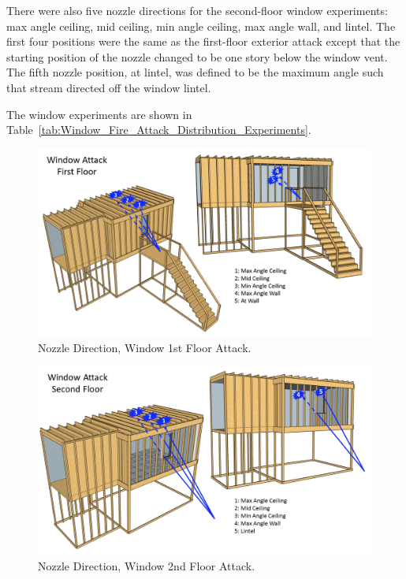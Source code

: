 \documentclass[12pt,oneside]{book}
\begin{document}
There were also five nozzle directions for the second-floor window experiments: max angle ceiling, mid ceiling, min angle ceiling, max angle wall, and lintel. The first four positions were the same as the first-floor exterior attack except that the starting position of the nozzle changed to be one story below the window vent. The fifth nozzle position, at lintel, was defined to be the maximum angle such that stream directed off the window lintel.

The window experiments are shown in Table~\ref{tab:Window_Fire_Attack_Distribution_Experiments}.

\begin{figure}[!ht]
	\centering
	\includegraphics[width=\columnwidth]{Figures/Water_Distribution/Nozzle_Position_ExtFirstfloor}
	\caption[Nozzle Direction, Window 1st Floor Attack]{Nozzle Direction, Window 1st Floor Attack.}
	\label{fig:Nozzle_Direction_Window_1st_Floor_Attack}
\end{figure}

\begin{figure}[!ht]
	\centering
	\includegraphics[width=\columnwidth]{Figures/Water_Distribution/Nozzle_Position_ExtSecondfloor}
	\caption[Nozzle Direction, Window 2nd Floor Attack]{Nozzle Direction, Window 2nd Floor Attack.}
	\label{fig:Nozzle_Direction_Window_2nd_Floor_Attack}
\end{figure}
\end{document}
